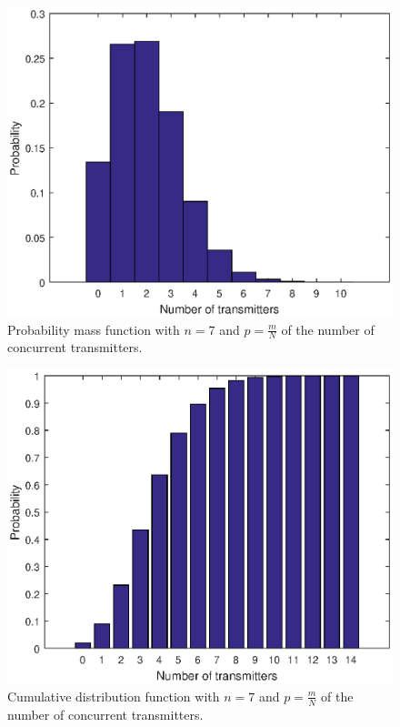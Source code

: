 		\begin{figure}[h!]
			\centering
			\includegraphics[width=\textwidth]{chapters/pmf-n=7-p=m_over_N.eps}
			\caption{Probability mass function with $n = 7$ and $p = \frac{m}{N}$ of the number of concurrent transmitters.}
			\label{fig:pmf-n=7}
		\end{figure}

		\begin{figure}[h!]
			\centering
			\includegraphics[width=\textwidth]{chapters/cdf-n=7-p=m_over_N.eps}
			\caption{Cumulative distribution function with $n = 7$ and $p = \frac{m}{N}$  of the number of concurrent transmitters.}
			\label{fig:cdf-n=7}
		\end{figure}


